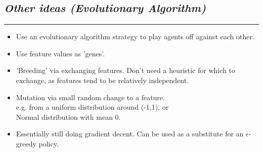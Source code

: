 \documentclass[10pt]{report}
\begin{document}
\begin{multicols}{2}
\section*{\emph{Other ideas (Evolutionary Algorithm)}}
\hrule
    \begin{itemize}
  \item
   	Use an evolutionary algorithm strategy to play agents off against each other.
  \item
	Use feature values as 'genes'.
  \item
	'Breeding' via exchanging features. Don't need a heuristic for which to exchange, as features tend to be relatively independent.
  \item
	Mutation via small random change to a feature.
	\\ e.g. from a uniform distribution around (-1,1), or
	\\ Normal distribution with mean 0.
  \item
	Essentially still doing gradient decent. Can be used as a substitute for an $\epsilon$-greedy policy.
  \end{itemize}
  
\end{multicols}
\end{document}
